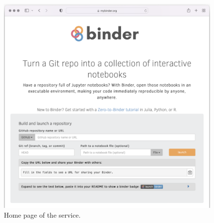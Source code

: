 \begin{figure}
  \begin{minipage}[b]{0.67\textwidth}
    \includegraphics[width=1.0\textwidth]{images/mybinder.png}
  \end{minipage}\hfill
  \begin{minipage}[b]{0.3\textwidth}
    \caption{Home page of the \mybinder{} service.}  \label{fig:mybinder-homepage}
  \end{minipage}
\end{figure}


